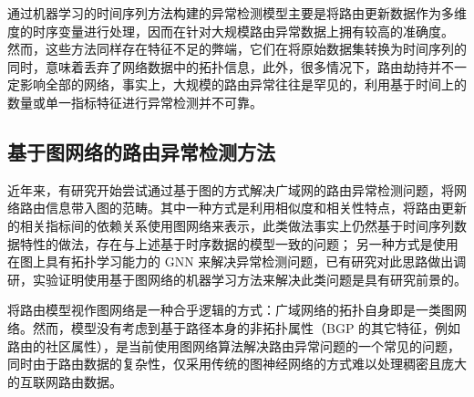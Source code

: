 通过机器学习的时间序列方法构建的异常检测模型主要是将路由更新数据作为多维度的时序变量进行处理，因而在针对大规模路由异常数据上拥有较高的准确度。  然而，这些方法同样存在特征不足的弊端，它们在将原始数据集转换为时间序列的同时，意味着丢弃了网络数据中的拓扑信息，此外，很多情况下，路由劫持并不一定影响全部的网络，事实上，大规模的路由异常往往是罕见的，利用基于时间上的数量或单一指标特征进行异常检测并不可靠。

\subsection{基于图网络的路由异常检测方法}


近年来，有研究开始尝试通过基于图的方式解决广域网的路由异常检测问题，将网络路由信息带入图的范畴。其中一种方式是利用相似度和相关性特点，将路由更新的相关指标间的依赖关系使用图网络来表示，此类做法事实上仍然基于时间序列数据特性的做法，存在与上述基于时序数据的模型一致的问题； 另一种方式是使用在图上具有拓扑学习能力的 GNN 来解决异常检测问题，已有研究对此思路做出调研，实验证明使用基于图网络的机器学习方法来解决此类问题是具有研究前景的。%

将路由模型视作图网络是一种合乎逻辑的方式：广域网络的拓扑自身即是一类图网络。然而，模型没有考虑到基于路径本身的非拓扑属性（BGP 的其它特征，例如路由的社区属性），是当前使用图网络算法解决路由异常问题的一个常见的问题，同时由于路由数据的复杂性，仅采用传统的图神经网络的方式难以处理稠密且庞大的互联网路由数据。
